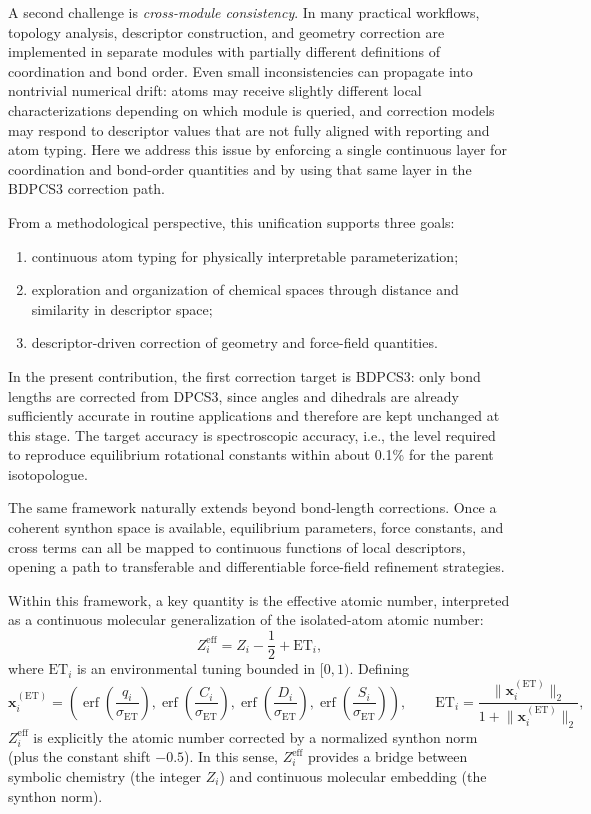 \documentclass[journal=jctcce,manuscript=article]{achemso}
\begin{document}
A second challenge is \emph{cross-module consistency}. In many practical workflows, topology analysis, descriptor construction, and geometry correction are implemented in separate modules with partially different definitions of coordination and bond order. Even small inconsistencies can propagate into nontrivial numerical drift: atoms may receive slightly different local characterizations depending on which module is queried, and correction models may respond to descriptor values that are not fully aligned with reporting and atom typing. Here we address this issue by enforcing a single continuous layer for coordination and bond-order quantities and by using that same layer in the BDPCS3 correction path.

From a methodological perspective, this unification supports three goals:
\begin{enumerate}
\item continuous atom typing for physically interpretable parameterization;
\item exploration and organization of chemical spaces through distance and similarity in descriptor space;
\item descriptor-driven correction of geometry and force-field quantities.
\end{enumerate}
In the present contribution, the first correction target is BDPCS3: only bond lengths are corrected from DPCS3, since angles and dihedrals are already sufficiently accurate in routine applications and therefore are kept unchanged at this stage.
The target accuracy is spectroscopic accuracy, i.e., the level required to reproduce equilibrium rotational constants within about 0.1\% for the parent isotopologue.

The same framework naturally extends beyond bond-length corrections. Once a coherent synthon space is available, equilibrium parameters, force constants, and cross terms can all be mapped to continuous functions of local descriptors, opening a path to transferable and differentiable force-field refinement strategies.

Within this framework, a key quantity is the effective atomic number, interpreted as a continuous molecular generalization of the isolated-atom atomic number:
\begin{equation}
Z^{\mathrm{eff}}_i = Z_i-\frac{1}{2}+\mathrm{ET}_i,
\end{equation}
where $\mathrm{ET}_i$ is an environmental tuning bounded in $[0,1)$. Defining
\begin{equation}
\mathbf{x}_i^{(\mathrm{ET})}=
\left(
\operatorname{erf}\!\left(\frac{q_i}{\sigma_{\mathrm{ET}}}\right),
\operatorname{erf}\!\left(\frac{C_i}{\sigma_{\mathrm{ET}}}\right),
\operatorname{erf}\!\left(\frac{D_i}{\sigma_{\mathrm{ET}}}\right),
\operatorname{erf}\!\left(\frac{S_i}{\sigma_{\mathrm{ET}}}\right)
\right),
\qquad
\mathrm{ET}_i=\frac{\lVert\mathbf{x}_i^{(\mathrm{ET})}\rVert_2}{1+\lVert\mathbf{x}_i^{(\mathrm{ET})}\rVert_2},
\end{equation}
$Z_i^{\mathrm{eff}}$ is explicitly the atomic number corrected by a normalized synthon norm (plus the constant shift $-0.5$). In this sense, $Z_i^{\mathrm{eff}}$ provides a bridge between symbolic chemistry (the integer $Z_i$) and continuous molecular embedding (the synthon norm).
\end{document}
